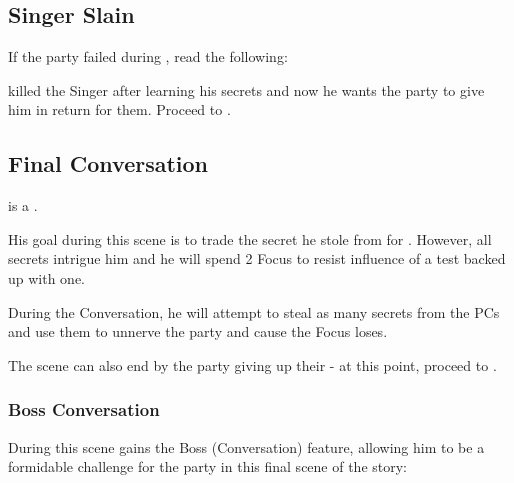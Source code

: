 \subsection{Singer Slain}
\label{ssec:3rdMeetingMurder}

If the party failed during , read the following:


\npcBlindBeggar{} killed the Singer after learning his secrets and now he wants the party to give him \lootSealedMessage{} in return for them. Proceed to .



\subsection{Final Conversation}
\label{ssec:3rdMeetingConversation}

\npcBlindBeggar{} is a \enemyCorruptedLightweaverC{}. 

His goal during this scene is to trade the secret he stole from \npcInformant{} for \lootSealedMessage{}. However, all secrets intrigue him and he will spend 2 Focus to resist influence of a test backed up with one.

During the Conversation, he will attempt to steal as many secrets from the PCs and use them to unnerve the party and cause the Focus loses.

The scene can also end by the party giving up their \lootSealedMessage{} - at this point, proceed to .



\subsubsection{Boss Conversation}

During this scene \npcBlindBeggar{} gains the Boss (Conversation) feature, allowing him to be a formidable challenge for the party in this final scene of the story:

